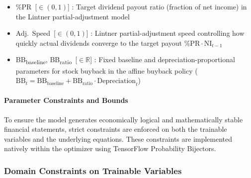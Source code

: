 \documentclass[12pt,a4paper]{article}
\begin{document}
\begin{itemize}
  financing raised as equity rather than debt
\item
  \%PR\, [$\in(0,1)$] : Target dividend payout ratio (fraction of net income) in the
  Lintner partial-adjustment model
\item
  Adj.\ Speed\, [$\in(0,1)$] : Lintner partial-adjustment speed controlling how
  quickly actual dividends converge to the target payout
  $\text{\%PR} \cdot \text{NI}_{t-1}$
\item
  BB\textsubscript{baseline}, BB\textsubscript{ratio}\, [$\in \mathbb{R}$] :
  Fixed baseline and depreciation-proportional parameters for stock buyback
  in the affine buyback policy
  ($\text{BB}_t = \text{BB}_{\text{baseline}} + \text{BB}_{\text{ratio}}
  \cdot \text{Depreciation}_t$)
\end{itemize}

\paragraph{Parameter Constraints and Bounds}

To ensure the model generates economically logical and mathematically
stable financial statements, strict constraints are enforced on both the
trainable variables and the underlying equations. These constraints are
implemented natively within the optimizer using TensorFlow Probability
Bijectors.

\subsubsection{Domain Constraints on Trainable Variables}
\end{document}
